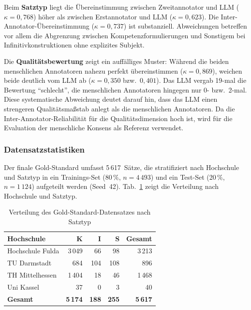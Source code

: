 Beim \textbf{Satztyp} liegt die Übereinstimmung zwischen Zweitannotator und LLM ($\kappa = 0{,}768$) höher als zwischen Erstannotator und LLM ($\kappa = 0{,}623$).
Die Inter-Annotator-Übereinstimmung ($\kappa = 0{,}737$) ist substanziell.
Abweichungen betreffen vor allem die Abgrenzung zwischen Kompetenzformulierungen und Sonstigem bei Infinitivkonstruktionen ohne explizites Subjekt.

Die \textbf{Qualitätsbewertung} zeigt ein auffälliges Muster: Während die beiden menschlichen Annotatoren nahezu perfekt übereinstimmen ($\kappa = 0{,}869$), weichen beide deutlich vom LLM ab ($\kappa = 0{,}350$ bzw.\ $0{,}401$).
Das LLM vergab 19-mal die Bewertung \enquote{schlecht}, die menschlichen Annotatoren hingegen nur 0- bzw.\ 2-mal.
Diese systematische Abweichung deutet darauf hin, dass das LLM einen strengeren Qualitätsmaßstab anlegt als die menschlichen Annotatoren.
Da die Inter-Annotator-Reliabilität für die Qualitätsdimension hoch ist, wird für die Evaluation der menschliche Konsens als Referenz verwendet.

\subsubsection{Datensatzstatistiken}\label{sec:eval-stats}

Der finale Gold-Standard umfasst 5\,617~Sätze, die stratifiziert nach Hochschule und Satztyp in ein Trainings-Set (80\,\%, $n = 4\,493$) und ein Test-Set (20\,\%, $n = 1\,124$) aufgeteilt werden (Seed~42).
Tab.~\ref{tab:datensatz-stats} zeigt die Verteilung nach Hochschule und Satztyp.

\begin{table}[H]
\caption{Verteilung des Gold-Standard-Datensatzes nach Satztyp\label{tab:datensatz-stats}}
\centering
\small
\begin{tabular}{lrrrr}
\hline
\textbf{Hochschule} & \textbf{K} & \textbf{I} & \textbf{S} & \textbf{Gesamt} \\
\hline
Hochschule Fulda & 3\,049 & 66 & 98 & 3\,213 \\
TU Darmstadt & 684 & 104 & 108 & 896 \\
TH Mittelhessen & 1\,404 & 18 & 46 & 1\,468 \\
Uni Kassel & 37 & 0 & 3 & 40 \\
\hline
\textbf{Gesamt} & \textbf{5\,174} & \textbf{188} & \textbf{255} & \textbf{5\,617} \\
\hline
\end{tabular}
\end{table}

